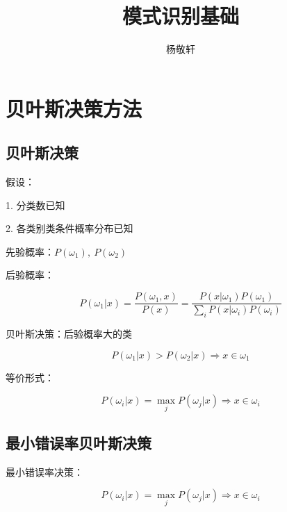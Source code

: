 \documentclass[openany,a4paper,12pt]{ctexbook}
\theoremstyle{kaiti}
\theoremstyle{normal}
\begin{document}
\title{\heiti \Huge 模式识别基础 \vspace{0.5cm}}
\author{\LARGE\kaishu 杨敬轩 \vspace{1cm}}

\maketitle
\thispagestyle{empty}

\frontmatter
\tableofcontents

\mainmatter
\chapter{贝叶斯决策方法}

\section{贝叶斯决策}

假设：

1. 分类数已知

2. 各类别类条件概率分布已知

先验概率：$P\left(\omega_1 \right),~P\left(\omega_2 \right)$

后验概率：

\begin{equation}
P\left(\omega_1|x \right)=\frac{P\left(\omega_1,x \right)}{P(x)}=\frac{P\left(x|\omega_1 \right)P\left(\omega_1 \right)}{\sum_iP\left(x|\omega_i \right)P\left(\omega_i \right)}
\end{equation}

贝叶斯决策：后验概率大的类

\begin{equation}
P\left(\omega_1|x \right)>P\left(\omega_2|x \right)\Rightarrow x\in \omega_1
\end{equation}

等价形式：

\begin{equation}
P\left(\omega_i|x \right)=\max_jP\left(\omega_j|x \right)\Rightarrow x\in \omega_i
\end{equation}

\section{最小错误率贝叶斯决策}

最小错误率决策：

\begin{equation}
P\left(\omega_i|x \right)=\max_jP\left(\omega_j|x \right)\Rightarrow x\in \omega_i
\end{equation}
\end{document}
